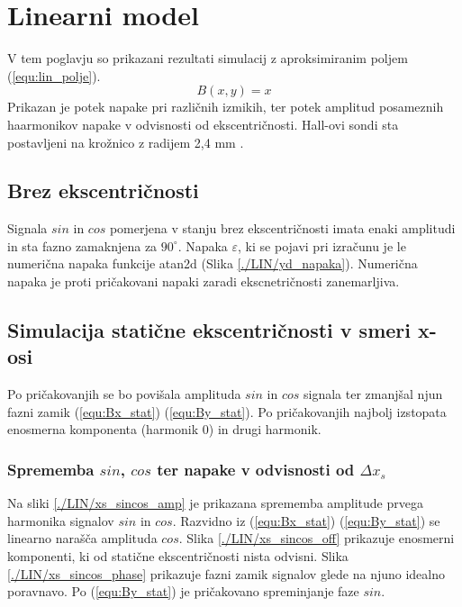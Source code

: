 \chapter{Linearni model}
V tem poglavju so prikazani rezultati simulacij z aproksimiranim poljem (\ref{equ:lin_polje}). 
\begin{equation}
\label{equ:lin_polje}
B(x,y)= x
\end{equation}
Prikazan je potek napake pri različnih izmikih, ter potek amplitud posameznih haarmonikov napake v odvisnosti od ekscentričnosti.
Hall-ovi sondi sta postavljeni na krožnico z radijem 2,4 mm \cite{AM8192}.
\section{Brez ekscentričnosti}
Signala $sin$ in $cos$ pomerjena v stanju brez ekscentričnosti imata enaki amplitudi in sta fazno zamaknjena za $90^{\circ}$. Napaka $\varepsilon$, ki se pojavi pri izračunu je le numerična napaka funkcije atan2d (Slika \ref{./LIN/yd_napaka}). Numerična napaka je proti pričakovani napaki zaradi ekscnetričnosti zanemarljiva.
\section{Simulacija statične ekscentričnosti v smeri x-osi}
Po pričakovanjih se bo povišala amplituda $sin$ in $cos$ signala ter zmanjšal njun fazni zamik (\ref{equ:Bx_stat})  (\ref{equ:By_stat}). Po pričakovanjih najbolj izstopata enosmerna komponenta (harmonik 0) in drugi harmonik.
\subsection{Sprememba $sin$, $cos$ ter napake v odvisnosti od $\Delta x_s$}
Na sliki \ref{./LIN/xs_sincos_amp} je prikazana sprememba amplitude prvega harmonika signalov $sin$ in $cos$. Razvidno iz (\ref{equ:Bx_stat})  (\ref{equ:By_stat}) se linearno narašča amplituda $cos$. Slika \ref{./LIN/xs_sincos_off} prikazuje enosmerni komponenti, ki od statične ekscentričnosti nista odvisni. Slika \ref{./LIN/xs_sincos_phase} prikazuje fazni zamik signalov glede na njuno idealno poravnavo. Po (\ref{equ:By_stat}) je pričakovano spreminjanje faze $sin$.

